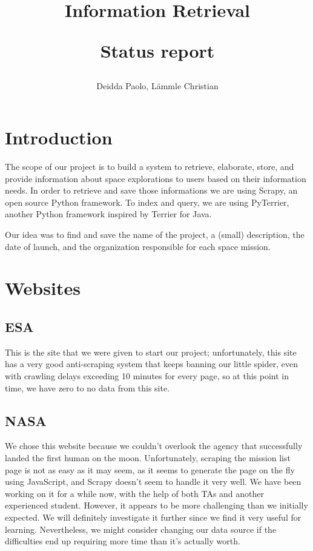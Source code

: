 \documentclass{article}
\title{
Information Retrieval

\begin{large} 
  Status report
\end{large} }
\author{Deidda Paolo, Lämmle Christian}
\begin{document}
\maketitle

\section{Introduction}\label{sec:introduction}

The scope of our project is to build a system to retrieve, elaborate, store, and provide information about space explorations to users based on their information needs. In order to retrieve and save those informations we are using Scrapy, an open source Python framework. To index and query, we are using PyTerrier, another Python framework inspired by Terrier for Java.

Our idea was to find and save the name of the project, a (small) description, the date of launch, and the organization responsible for each space mission.

\section{Websites}

\subsection{ESA}\label{subsec:esa}
This is the site that we were given to start our project; unfortunately, this site has a very good anti-scraping system that keeps banning our little spider, even with crawling delays exceeding 10 minutes for every page, so at this point in time, we have zero to no data from this site.

\subsection{NASA}\label{subsec:nasa}
We chose this website because we couldn't overlook the agency that successfully landed the first human on the moon. Unfortunately, scraping the mission list page is not as easy as it may seem, as it seems to generate the page on the fly using JavaScript, and Scrapy doesn't seem to handle it very well. We have been working on it for a while now, with the help of both TAs and another experienced student. However, it appears to be more challenging than we initially expected. We will definitely investigate it further since we find it very useful for learning. Nevertheless, we might consider changing our data source if the difficulties end up requiring more time than it's actually worth.
\end{document}
